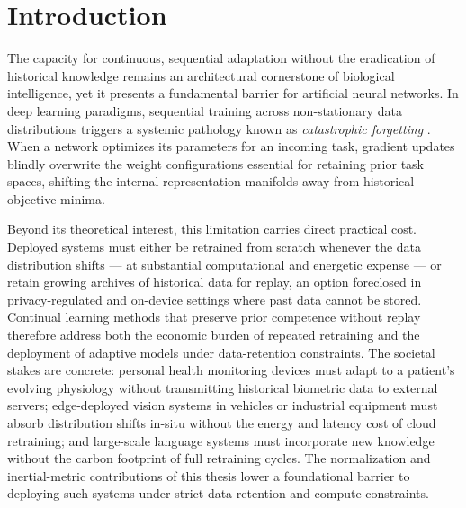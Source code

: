 \section{Introduction}
\label{sec:introduction}

The capacity for continuous, sequential adaptation without the eradication of
historical knowledge remains an architectural cornerstone of biological
intelligence, yet it presents a fundamental barrier for artificial neural
networks. In deep learning paradigms, sequential training across non-stationary
data distributions triggers a systemic pathology known as \emph{catastrophic
forgetting} \citep{mccloskey_catastrophic_1989}. When a network optimizes its
parameters for an incoming task, gradient updates blindly overwrite the weight
configurations essential for retaining prior task spaces, shifting the internal
representation manifolds away from historical objective minima.

Beyond its theoretical interest, this limitation carries direct practical
cost. Deployed systems must either be retrained from scratch whenever the
data distribution shifts --- at substantial computational and energetic
expense --- or retain growing archives of historical data for replay, an
option foreclosed in privacy-regulated and on-device settings where past
data cannot be stored. Continual learning methods that preserve prior
competence without replay therefore address both the economic burden of
repeated retraining and the deployment of adaptive models under
data-retention constraints. The societal stakes are concrete: personal
health monitoring devices must adapt to a patient's evolving physiology
without transmitting historical biometric data to external servers;
edge-deployed vision systems in vehicles or industrial equipment must
absorb distribution shifts in-situ without the energy and latency cost of
cloud retraining; and large-scale language systems must incorporate new
knowledge without the carbon footprint of full retraining cycles.
The normalization and inertial-metric contributions of this thesis lower
a foundational barrier to deploying such systems under strict data-retention
and compute constraints.

